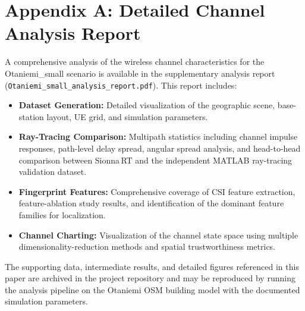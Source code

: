 \section*{Appendix A: Detailed Channel Analysis Report}
\label{app:analysis_report}

A comprehensive analysis of the wireless channel characteristics for the
Otaniemi\_small scenario is available in the supplementary analysis report
(\texttt{Otaniemi\_small\_analysis\_report.pdf}). This report includes:

\begin{itemize}
  \item \textbf{Dataset Generation:} Detailed visualization of the geographic
        scene, base-station layout, UE grid, and simulation parameters.
  \item \textbf{Ray-Tracing Comparison:} Multipath statistics including
        channel impulse responses, path-level delay spread, angular spread
        analysis, and head-to-head comparison between Sionna\,RT and the
        independent MATLAB ray-tracing validation dataset.
  \item \textbf{Fingerprint Features:} Comprehensive coverage of CSI
        feature extraction, feature-ablation study results, and identification
        of the dominant feature families for localization.
  \item \textbf{Channel Charting:} Visualization of the channel state space
        using multiple dimensionality-reduction methods and spatial
        trustworthiness metrics.
\end{itemize}

The supporting data, intermediate results, and detailed figures referenced
in this paper are archived in the project repository and may be reproduced
by running the analysis pipeline on the Otaniemi OSM building model with
the documented simulation parameters.
